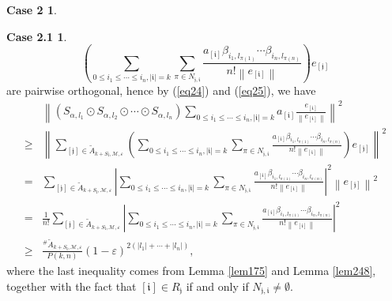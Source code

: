 \documentclass[11pt]{article}
\theoremstyle{plain}
\theoremstyle{definition}
\newtheorem*{case2}{Case 2}
\newtheorem*{case2.1}{Case 2.1}
\begin{document}
{\begin{case2}
\begin{case2.1}
$$			\left (\sum\limits_{0 \leq i_1 \leq \cdots \leq i_n, |\mathfrak{i}|=k}
 \sum\limits_{\pi \in N_{\mathfrak{j}, \mathfrak{i}  } }\frac{a_{[\mathfrak{i}]}			\beta_{i_{1},l_{\pi  (1)}} \cdots\beta_{i_{n},l_{\pi  (n)}}}{n!\left \| e_{[\mathfrak{i}]} \right \|} \right )
			e_{[\mathfrak{j}]}$$
are pairwise orthogonal,
		hence by (\ref{eq24}) and (\ref{eq25}), we have
		\begin{equation}\label{eq2511}  \begin{aligned}
			&	\left \| \left ( S_{\alpha,{l_{1}}}\odot S_{\alpha,{l_{2}}}\odot \cdots \odot S_{\alpha,{l_{n}}}  \right )
			\sum\limits_{0 \leq i_1 \leq \cdots \leq i_n, |\mathfrak{i}|=k}a_{[\mathfrak{i}]} \frac{ e_{[\mathfrak{i}]} }{\left \|  e_{[\mathfrak{i}]}  \right \| }       \right \| ^{2}
			\\\ge& \left \| \sum\limits_{[\mathfrak{j}]\in \tilde{A}_{k+S_{\mathfrak{l}},\mathscr{M},\varepsilon }  }
			\left ( \sum\limits_{0 \leq i_1 \leq \cdots \leq i_n, |\mathfrak{i}|=k}
 \sum\limits_{\pi \in N_{\mathfrak{j}, \mathfrak{i}  } } \frac{a_{[\mathfrak{i}]}		\beta_{i_{1},l_{\pi  (1)}}\cdots\beta_{i_{n},l_{\pi  (n)}}}{n!\left \| e_{[\mathfrak{i}]} \right \|} \right )
				e_{[\mathfrak{j}]}   \right \| ^{2}
			\\= &\sum\limits_{[\mathfrak{j}]\in \tilde{A}_{k+S_{\mathfrak{l}},\mathscr{M},\varepsilon }} \left | \sum\limits_{0 \leq i_1 \leq \cdots \leq i_n, |\mathfrak{i}|=k}
 \sum\limits_{\pi \in N_{\mathfrak{j}, \mathfrak{i}  } }\frac{a_{[\mathfrak{i}]}		\beta_{i_{1},l_{\pi  (1)}} \cdots\beta_{i_{n},l_{\pi  (n)}} }{n!\left \| e_{[\mathfrak{i}]} \right \|} \right | ^{2}
			\left \| e_{[\mathfrak{j}]}  \right \| ^{2}
			\\= &\frac{1}{n!}\sum\limits_{[\mathfrak{j}]\in \tilde{A}_{k+S_{\mathfrak{l}},\mathscr{M},\varepsilon}}
			\left | \sum\limits_{0 \leq i_1 \leq \cdots \leq i_n, |\mathfrak{i}|=k}
 \sum\limits_{\pi \in N_{\mathfrak{j}, \mathfrak{i}  } }\frac{a_{[\mathfrak{i}]}		\beta_{i_{1},l_{\pi  (1)}} \cdots\beta_{i_{n},l_{\pi  (n)}} }{n!\left \| e_{[\mathfrak{i}]} \right \|} \right | ^{2}\\ \ge&  \frac{^{\#  } \tilde{A}_{k+S_{\mathfrak{l}},\mathscr{M},\varepsilon } }{P(k ,n) } \left ( 1 - \varepsilon \right ) ^{2\left ( \left | l_{1} \right |  + \cdots +\left | l_{n} \right | \right ) },
		\end{aligned}	\end{equation}
where the last inequality comes from Lemma \ref{lem175} and Lemma \ref{lem248}, together with the fact that $[\mathfrak{i}] \in R_{\mathfrak{j} }$ if and only if $N_{\mathfrak{j},\mathfrak{i} }  \neq \emptyset.$

\end{case2.1}
\end{case2}}
\end{document}
